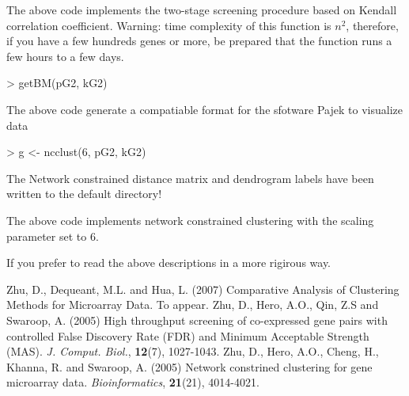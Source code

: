 \documentclass[a4paper]{article}
\begin{document}
The above code implements the two-stage screening procedure based on Kendall
correlation coefficient. Warning: time complexity of this function is $n^2$,
therefore, if you have a few hundreds genes or more, be prepared that the function
runs a few hours to a few days. 
\begin{Schunk}
\begin{Sinput}
> getBM(pG2, kG2)
\end{Sinput}
\end{Schunk}
The above code generate a compatiable format for the sfotware Pajek to visualize data  
\begin{Schunk}
\begin{Sinput}
> g <- ncclust(6, pG2, kG2)
\end{Sinput}
\begin{Soutput}
The Network constrained distance matrix and dendrogram labels have been written to the default directory!
\end{Soutput}
\end{Schunk}
The above code implements network constrained clustering with the scaling parameter
set to $6$.

If you prefer to read the above descriptions in a more rigirous way. 


\begin{thebibliography}{}
 Zhu, D., Dequeant, M.L. and Hua, L.
(2007) Comparative Analysis of Clustering Methods for Microarray Data. To appear.
 Zhu, D., Hero, A.O., Qin, Z.S and Swaroop, A. (2005) High throughput screening of co-expressed gene pairs
with controlled False Discovery Rate (FDR) and Minimum Acceptable
Strength (MAS). {\it J. Comput. Biol.}, {\bf 12}(7), 1027-1043.
 Zhu, D., Hero, A.O., Cheng, H., Khanna, R. and Swaroop, A. (2005) Network constrined clustering for gene microarray data. {\it
Bioinformatics}, {\bf 21}(21), 4014-4021.
\end{thebibliography}
\end{document}
